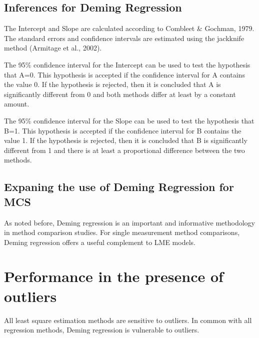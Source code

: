 \documentclass[12pt, a4paper]{report}
\theoremstyle{plain}
\theoremstyle{definition}
\theoremstyle{remark}
\begin{document}

\subsection{Inferences for Deming Regression}
The Intercept and Slope are calculated according to Combleet \& Gochman, 1979. The standard errors and confidence intervals are estimated using the jackknife method (Armitage et al., 2002).

The 95\% confidence interval for the Intercept can be used to test the hypothesis that A=0. This hypothesis is accepted if the confidence interval for A contains the value 0. If the hypothesis is rejected, then it is concluded that A is significantly different from 0 and both methods differ at least by a constant amount.

The 95\% confidence interval for the Slope can be used to test the hypothesis that B=1. This hypothesis is accepted if the confidence interval for B contains the value 1. If the hypothesis is rejected, then it is concluded that B is significantly different from 1 and there is at least a proportional difference between the two methods.






\subsection{Expaning the use of Deming Regression for MCS}
As noted before, Deming regression is an important and informative methodology in method comparison studies.
For single measurement method comparisons, Deming regression offers a useful complement to LME models.












\section{Performance in the presence of outliers}
All least square estimation methods are sensitive to outliers.
In common with all regression methods, Deming regression is vulnerable to outliers. 
\end{document}
